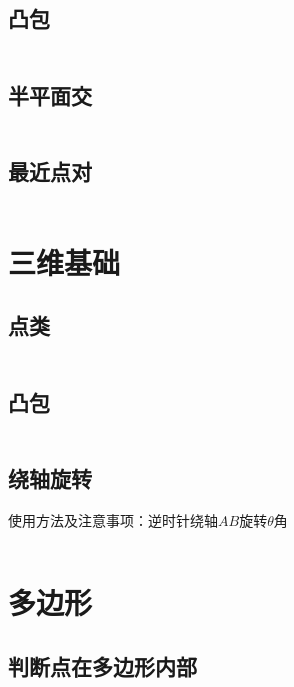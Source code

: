 \documentclass[a4paper,openany]{book}
\newcommand{\cppcode}[1]{
    \inputminted[mathescape,
    			 tabsize=4,
    			 linenos,
    			 frame=single,
    			 framesep=2mm,
    			 breakaftergroup=true,
    			 breakautoindent=true,
    			 breakbytoken=true,
    			 breaklines=true
    ]{cpp}{#1}
}
\begin{document}
\begin{spacing}{1.0}
			\subsection{凸包}
				\cppcode{Source/Computational-Geometry/Convex-Hull-2D.cpp}
			\subsection{半平面交}
				\cppcode{Source/Computational-Geometry/Half-Plane-Intersection.cpp}
			\subsection{最近点对}
				\cppcode{Source/Computational-Geometry/Closest-Pair-Of-Points.cpp}
		\section{三维基础}
			\subsection{点类}
				\cppcode{Source/Computational-Geometry/Point-Class-3D.cpp}
			\subsection{凸包}
				\cppcode{Source/Computational-Geometry/Convex-Hull-3D.cpp}
			\subsection{绕轴旋转}
				使用方法及注意事项：逆时针绕轴$AB$旋转$\theta$角
				\cppcode{Source/Computational-Geometry/Rotate-3D.cpp}
		\section{多边形}
			\subsection{判断点在多边形内部}
				\cppcode{Source/Computational-Geometry/Point-In-Polygon.cpp}

\end{spacing}
\end{document}
